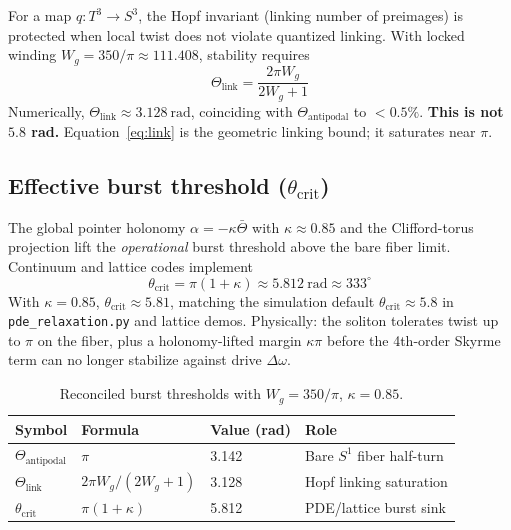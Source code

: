 \documentclass[11pt]{article}
\begin{document}
For a map $q : T^3 \to S^3$, the Hopf invariant (linking number of preimages) is protected when
local twist does not violate quantized linking. With locked winding $W_g = 350/\pi \approx 111.408$,
stability requires
\begin{equation}
\boxed{\;
\Theta_{\mathrm{link}} = \frac{2\pi W_g}{2W_g + 1}
\;}
\label{eq:link}
\end{equation}
Numerically, $\Theta_{\mathrm{link}} \approx 3.128~\mathrm{rad}$, coinciding with
$\Theta_{\mathrm{antipodal}}$ to $<0.5\%$. \textbf{This is not $5.8$ rad.}
Equation~\eqref{eq:link} is the geometric linking bound; it saturates near $\pi$.

\subsection{Effective burst threshold ($\theta_{\mathrm{crit}}$)}

The global pointer holonomy $\alpha = -\kappa\bar{\Theta}$ with $\kappa \approx 0.85$ and the
Clifford-torus projection lift the \emph{operational} burst threshold above the bare fiber limit.
Continuum and lattice codes implement
\begin{equation}
\boxed{\;
\theta_{\mathrm{crit}} = \pi(1 + \kappa) \approx 5.812~\mathrm{rad} \approx 333^\circ
\;}
\label{eq:burst}
\end{equation}
With $\kappa = 0.85$, $\theta_{\mathrm{crit}} \approx 5.81$, matching the simulation default
$\theta_{\mathrm{crit}} \approx 5.8$ in \texttt{pde\_relaxation.py} and lattice demos.
Physically: the soliton tolerates twist up to $\pi$ on the fiber, plus a holonomy-lifted margin
$\kappa\pi$ before the 4th-order Skyrme term can no longer stabilize against drive $\Delta\omega$.

\begin{table}[h]
\centering
\small
\begin{tabular}{|l|l|l|l|}
\hline
Symbol & Formula & Value (rad) & Role \\
\hline
$\Theta_{\mathrm{antipodal}}$ & $\pi$ & 3.142 & Bare $S^1$ fiber half-turn \\
$\Theta_{\mathrm{link}}$ & $2\pi W_g/(2W_g+1)$ & 3.128 & Hopf linking saturation \\
$\theta_{\mathrm{crit}}$ & $\pi(1+\kappa)$ & 5.812 & PDE/lattice burst sink \\
\hline
\end{tabular}
\caption{Reconciled burst thresholds with $W_g=350/\pi$, $\kappa=0.85$.}
\end{table}
\end{document}
